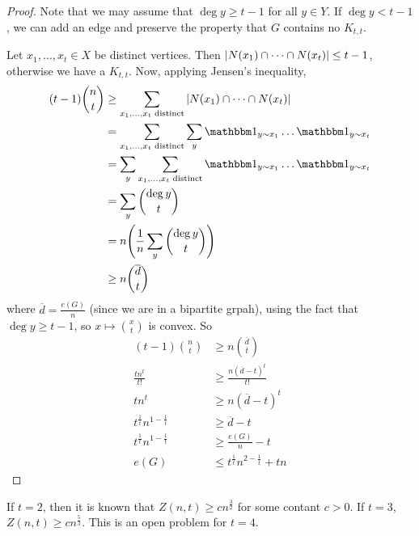\begin{proof}
	Note that we may assume that \( \deg y \geq t - 1 \) for all \( y \in Y \).
	If \( \deg y < t - 1 \), we can add an edge and preserve the property that \( G \) contains no \( K_{t,t} \).

	Let \( x_1, \dots, x_t \in X \) be distinct vertices.
	Then \( \abs{N(x_1) \cap \dots \cap N(x_t)} \leq t - 1 \), otherwise we have a \( K_{t,t} \).
	Now, applying Jensen's inequality,
	\begin{align*}
		(t-1) \binom n t &\geq \sum_{x_1, \dots, x_t \text{ distinct}} \abs{N(x_1) \cap \dots \cap N(x_t)} \\
		&= \sum_{x_1, \dots, x_t \text{ distinct}} \sum_y \mathbbm 1_{y \sim x_1} \dots \mathbbm 1_{y \sim x_t} \\
		&= \sum_y \sum_{x_1, \dots, x_t \text{ distinct}} \mathbbm 1_{y \sim x_1} \dots \mathbbm 1_{y \sim x_t} \\
		&= \sum_y \binom{\deg y}{t} \\
		&= n \qty( \frac{1}{n} \sum_y \binom{\deg y}{t} ) \\
		&\geq n \binom{\overline d}{t}
	\end{align*}
	where \( \overline d = \frac{e(G)}{n} \) (since we are in a bipartite grpah), using the fact that \( \deg y \geq t - 1 \), so \( x \mapsto \binom x t \) is convex.
	So
	\begin{align*}
		(t-1) \binom n t &\geq n \binom{\overline d}{t} \\
		\frac{tn^t}{t!} &\geq \frac{n(\overline d - t)^t}{t!} \\
		tn^t &\geq n(\overline d - t)^t \\
		t^{\frac{1}{t}} n^{1 - \frac{1}{t}} &\geq \overline d - t \\
		t^{\frac{1}{t}} n^{1 - \frac{1}{t}} &\geq \frac{e(G)}{n} - t \\
		e(G) &\leq t^{\frac{1}{t}} n^{2 - \frac{1}{t}} + tn
	\end{align*}
\end{proof}
\begin{remark}
	If \( t = 2 \), then it is known that \( Z(n,t) \geq cn^{\frac{3}{2}} \) for some contant \( c > 0 \).
	If \( t = 3 \), \( Z(n,t) \geq cn^{\frac{5}{3}} \).
	This is an open problem for \( t = 4 \).
\end{remark}

